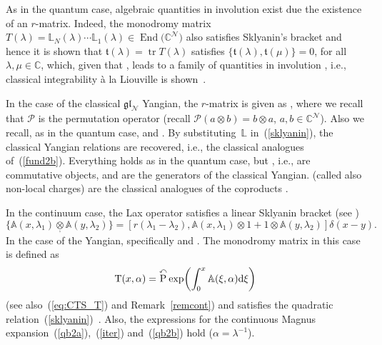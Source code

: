 \documentclass[pdftex]{sigma}
\numberwithin{equation}{section}
\theoremstyle{definition}
\DeclareMathOperator{\EEnd}{End}%
\begin{document}
As in the quantum case, algebraic quantities in involution exist due the existence of an $r$-matrix. Indeed, the monodromy matrix $T(\lambda) = {\mathbb L}_N(\lambda) \cdots {\mathbb L}_1(\lambda) \in \EEnd\bigl({\mathbb C}^{\mathcal N}\bigr)$ also satisfies Sklyanin's bracket and hence it is shown that ${\mathfrak t}(\lambda)= \operatorname{tr} T(\lambda)$ satisfies $\{ {\mathfrak t}(\lambda), {\mathfrak t}(\mu)\} =0 $, for all~${\lambda, \mu \in {\mathbb C}}$, which, given that , leads to a family of quantities in involution , i.e., classical integrability {\`a} la Liouville is shown~\cite{FT}.

In the case of the classical $ \mathfrak{gl}_{\mathcal N}$ Yangian, the $r$-matrix is given as , where we recall that ${\mathcal P}$ is the  permutation operator \big(recall ${\mathcal P} (a\otimes b) = b \otimes a$, $a, b \in {\mathbb C}^{\mathcal N}$\big). Also we recall, as in the quantum case,  and . By substituting~${\mathbb L}$ in~(\ref{sklyanin}), the classical Yangian relations are recovered, i.e., the classical analogues of~(\ref{fund2b}). Everything holds as in the quantum case, but \smash{$[\ ,\, ] \mapsto - \{\ ,\, \}$}, i.e.,  are commutative objects, and are the generators of the classical Yangian.  (called also non-local charges) are the classical analogues of the coproducts .

In the continuum case, the Lax operator \smash{${\mathbb A}(x, \lambda) \in \EEnd\bigl({\mathbb C}^{\mathcal N}\bigr)$} satisfies a linear Sklyanin bracket (see \cite{FT})
\begin{equation*}
\{ {\mathbb A}(x,\lambda_1) \underset{,}{\otimes} {\mathbb A}(y, \lambda_2)\} = [r(\lambda_1-\lambda_2), {\mathbb A}(x,\lambda_1)\otimes 1 + 1 \otimes {\mathbb A}(y,\lambda_2)]\delta(x-y). %
\end{equation*}
In the case of the Yangian, specifically  and . The monodromy matrix in this case is defined as
\[
{\rm T}(x, \alpha) = \overset{\curvearrowleft} {\mathrm P} \exp \biggl(\int_{0}^{x}{\mathbb A}(\xi, \alpha) {\rm d}\xi\biggr)
\] (see also~(\ref{eq:CTS_T}) and Remark~\ref{remcont}) and satisfies the quadratic relation~(\ref{sklyanin})~\cite{FT, Mac}. Also, the expressions for the continuous Magnus expansion~(\ref{qb2a}),~(\ref{iter}) and~(\ref{qb2b}) hold \big($\alpha = \lambda^{-1}$\big).
\end{document}
